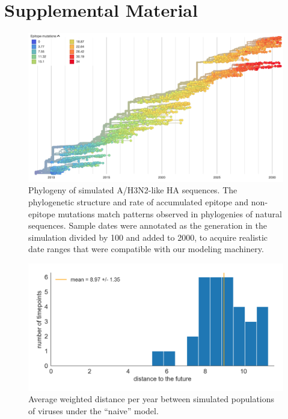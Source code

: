 \setcounter{figure}{0}
\setcounter{table}{0}
\renewcommand{\thefigure}{S\arabic{figure}}
\renewcommand{\thetable}{S\Roman{table}}

\section*{Supplemental Material}

\begin{figure}[h]
  \begin{center}
  \includegraphics[width=\textwidth]{figures/simulated-h3n2-ha-phylogeny.png}
  \caption{Phylogeny of simulated A/H3N2-like HA sequences. The phylogenetic structure and rate of accumulated epitope and non-epitope mutations match patterns observed in phylogenies of natural sequences. Sample dates were annotated as the generation in the simulation divided by 100 and added to 2000, to acquire realistic date ranges that were compatible with our modeling machinery.}
  \label{sup_fig:simulated_h3n2_ha_phylogeny}
  \end{center}
\end{figure}

\begin{figure}[t]
  \begin{center}
  \includegraphics[width=\textwidth]{figures/distance-of-simulated-populations-between-timepoints.png}
  \caption{Average weighted distance per year between simulated populations of viruses under the ``naive'' model.}
  \label{sup_fig:distance_of_simulated_populations_between_timepoints}
  \end{center}
\end{figure}


